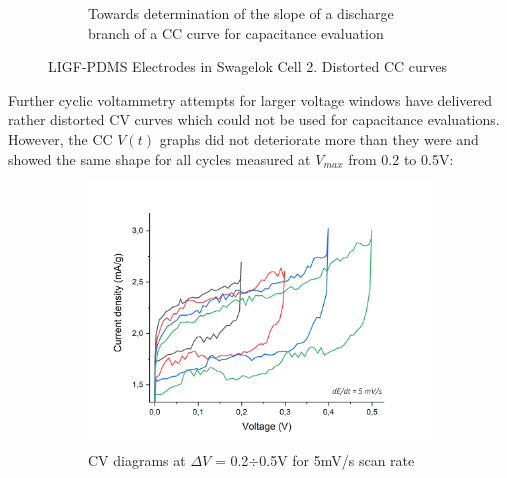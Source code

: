 \begin{figure}[H]
\begin{subfigure}{0.49\textwidth}
\captionsetup{width=0.9\linewidth}
\caption{Towards determination of the slope of a discharge branch of a CC curve for capacitance evaluation}
\label{fig:cc-slope-determination-2}
\end{subfigure}
\medskip
\caption{LIGF-PDMS Electrodes in Swagelok Cell 2. Distorted CC curves}
\label{fig:LIGF-PDMS-CC-12}
\end{figure}

Further cyclic voltammetry attempts for larger voltage windows have delivered rather distorted CV curves which could not be used for capacitance evaluations. However, the CC $V(t)$ graphs did not deteriorate more than they were and showed the same shape for all cycles measured at $V_{max}$ from 0.2 to 0.5\:V:

\begin{figure}[H]
\begin{subfigure}{0.49\textwidth}
\includegraphics[width=1\textwidth]{Figures/Results/Electrochemistry/LIGF-PDMS-NaNO3-Swagelok/Cell2/CV-high-voltage.jpg} 
\captionsetup{width=0.9\linewidth}
\caption{CV diagrams at $\Delta V$ = 0.2$\div$0.5\:V for 5\:mV/s scan rate}
\label{fig:LIGF-PDMS-cell2-CV06}
\end{subfigure}
\begin{subfigure}{0.49\textwidth}

\end{subfigure}
\end{figure}

